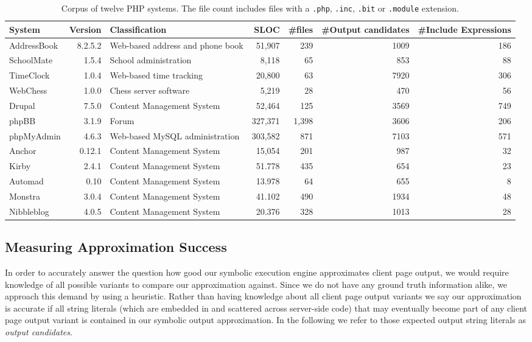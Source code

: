 \documentclass[sigconf, preprint]{acmart}
\renewcommand{\tt}[1]{\texttt{#1}}
\begin{document}
\begin{table*}[t]
\centering 
	\begin{tabular}{lrp{5cm}rrrr}
	\toprule
	\textbf{System} & \textbf{Version} & \textbf{Classification} & \textbf{SLOC} &
	\textbf{\#files} & \textbf{\#Output candidates} & \textbf{\#Include
	Expressions}\\
	\midrule
	AddressBook & 8.2.5.2 & Web-based address and phone book & 51,907 & 239  & 1009
	& 186\\
	SchoolMate & 1.5.4 & School administration & 8,118 & 65  & 853 & 88\\
	TimeClock & 1.0.4 & Web-based time tracking & 20,800 & 63  & 7920 & 306\\
	WebChess & 1.0.0 & Chess server software & 5,219 & 28  & 470 & 56\\
	\midrule
	Drupal & 7.5.0 & Content Management System &  52,464 & 125  & 3569 & 749\\
	phpBB & 3.1.9 & Forum & 327,371 & 1,398  & 3606 & 206\\
	phpMyAdmin & 4.6.3 & Web-based MySQL administration & 303,582 & 871  & 7103 &
	571\\
	\midrule
	Anchor & 0.12.1 & Content Management System & 15,054 & 201 & 987 & 32\\
	Kirby & 2.4.1 & Content Management System & 51.778 & 435  & 654 & 23\\
	Automad & 0.10 & Content Management System & 13.978 & 64  & 655 & 8\\
	Monstra & 3.0.4 & Content Management System & 41.102 & 490  & 1934 & 48\\
	Nibbleblog & 4.0.5 & Content Management System & 20.376 & 328  & 1013 & 28\\
	\bottomrule
	\end{tabular}
	\caption{Corpus of twelve PHP systems. The file count includes files with a
	\tt{.php}, \tt{.inc}, \tt{.bit} or \tt{.module} extension.}
	\label{corpus}
\end{table*}

\subsection{Measuring Approximation Success} \label{heuristic}
In order to accurately answer the question how good our symbolic execution
engine approximates client page output, we would require knowledge of all
possible variants to compare our approximation against. Since we do not have
any ground truth information alike, we approach this demand by using a
heuristic. Rather than having knowledge about all client page output variants
we say our approximation is accurate if all string literals (which are embedded
in and  scattered across server-side code) that may eventually become part of any
client page output variant is contained in our symbolic output approximation. In
the following we refer to those expected output string literals as \emph{output candidates}.
\end{document}
